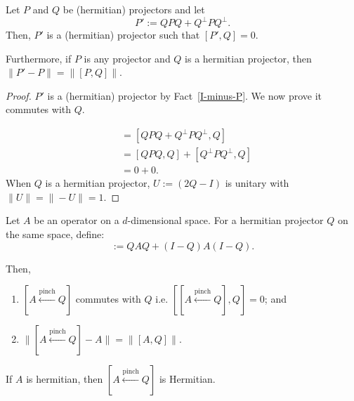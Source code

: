 \begin{theorem}
    Let $P$ and $Q$ be (hermitian) projectors and let 
    \[P' := QPQ + Q^\bot P Q^\bot.\]
    Then, $P'$ is a (hermitian) projector such that $[P', Q] = 0$. 
    
    \noindent Furthermore, if $P$ is any projector and $Q$ is a hermitian projector, then $\| P' - P \| = \|[P,Q] \| $.
\end{theorem}
\begin{proof}
$P'$ is a (hermitian) projector by Fact~\ref{I-minus-P}. We now prove it commutes with $Q$.

\begin{align*}
    [P', Q] &= [QPQ + Q^\bot P Q^\bot, Q]\\
    &= [QPQ, Q] + [Q^\bot P Q^\bot, Q]\\
    &= 0 + 0.
\end{align*}
When $Q$ is a hermitian projector, $U := (2Q - I)$ is unitary with $\|U\| = \|-U\| = 1$. %

\end{proof}




\begin{lemma}
Let $A$ be an operator on a $d$-dimensional space. For a hermitian projector $Q$ on the same space, define:
\begin{equation}
    [A \overset{\text{pinch}}{\gets} Q] :=  Q A Q + (I-Q) A (I - Q).
\end{equation}


\noindent Then,
\begin{enumerate}
    \item $[A \overset{\text{pinch}}{\gets} Q]$ commutes with $Q$ i.e. $[[A \overset{\text{pinch}}{\gets} Q], Q] = 0$; and
    \item $\| [A \overset{\text{pinch}}{\gets} Q] - A\| = \|[A,Q]\|$.
\end{enumerate}

\noindent If $A$ is hermitian, then $[A \overset{\text{pinch}}{\gets} Q]$ is Hermitian.

\end{lemma}

